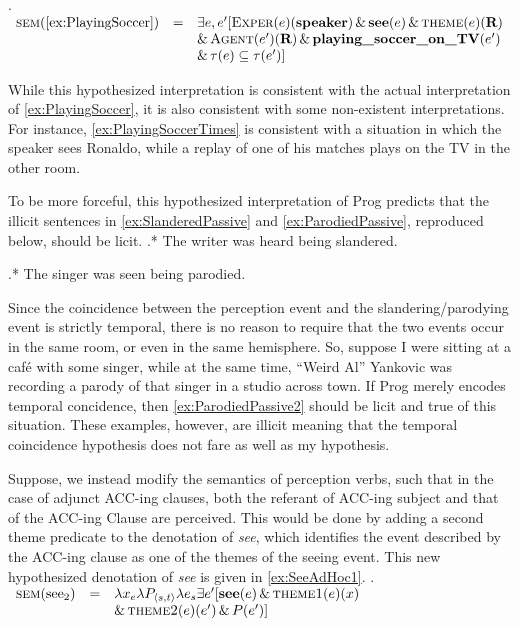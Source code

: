 \documentclass[MilwayThesis]{subfiles}
\begin{document}
\ex.\label{ex:PlayingSoccerTimes} 
$\begin{array}{rcl}
	\textsc{sem}(\cref{ex:PlayingSoccer}) & =  & \exists e, e^{\prime} [\textsc{Exper}(e)(\textbf{speaker}) \,\&\, \textbf{see}(e) \,\&\, \textsc{theme}(e)(\textbf{R})\\
	& & \&\, \textsc{Agent}(e^{\prime})(\textbf{R}) \,\&\, \textbf{playing\_soccer\_on\_TV}(e^{\prime})\\
	& & \&\, \tau(e) \subseteq \tau(e^{\prime})] 
\end{array}$

While this hypothesized interpretation is consistent with the actual interpretation of \cref{ex:PlayingSoccer}, it is also consistent with some non-existent interpretations.
For instance, \cref{ex:PlayingSoccerTimes} is consistent with a situation in which the speaker sees Ronaldo, while a replay of one of his matches plays on the TV in the other room.

To be more forceful, this hypothesized interpretation of Prog predicts that the illicit sentences in \cref{ex:SlanderedPassive} and \cref{ex:ParodiedPassive}, reproduced below, should be licit.
\ex.* The writer was heard being slandered.\label{ex:SlanderedPassive22}

\ex.* The singer was seen being parodied.\label{ex:ParodiedPassive2}

Since the coincidence between the perception event and the slandering/parodying event is strictly temporal, there is no reason to require that the two events occur in the same room, or even in the same hemisphere.
So, suppose I were sitting at a caf\'e with some singer, while at the same time, ``Weird Al'' Yankovic was recording a parody of that singer in a studio across town.
If Prog merely encodes temporal concidence, then \cref{ex:ParodiedPassive2} should be licit and true of this situation.
These examples, however, are illicit meaning that the temporal coincidence hypothesis does not fare as well as my hypothesis.

Suppose, we instead modify the semantics of perception verbs, such that in the case of adjunct ACC-ing clauses, both the referant of ACC-ing subject and that of the ACC-ing Clause are perceived.
This would be done by adding a second theme predicate to the denotation of \textit{see}, which identifies the event described by the ACC-ing clause as one of the themes of the seeing event.
This new hypothesized denotation of \textit{see} is given in \cref{ex:SeeAdHoc1}.
\ex.\label{ex:SeeAdHoc1}
$
\begin{array}[t]{rcl}
	\textsc{sem}(\text{see}_2) & = & \lambda x_e \lambda P_{\langle s,t\rangle} \lambda e_{s} \exists e^{\prime} [\textbf{see}(e) \,\&\, \textsc{theme1}(e)(x) \\
		& & \&\, \textsc{theme2}(e)(e^{\prime}) \,\&\, P(e^{\prime})]
\end{array}
$
\end{document}
